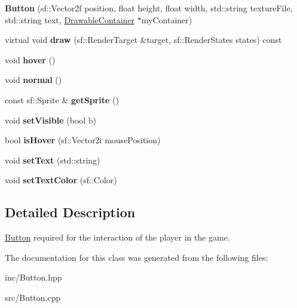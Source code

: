 \begin{DoxyCompactItemize}
\item 
\hypertarget{class_button_a7a01c89d2c25933075045e118d913ddb}{{\bfseries Button} (sf\+::\+Vector2f position, float height, float width, std\+::string texture\+File, std\+::string text, \hyperlink{class_drawable_container}{Drawable\+Container} $\ast$my\+Container)}\label{class_button_a7a01c89d2c25933075045e118d913ddb}

\item 
\hypertarget{class_button_a5e03d641bbba9c1e13d4e0425f4c7c2c}{virtual void {\bfseries draw} (sf\+::\+Render\+Target \&target, sf\+::\+Render\+States states) const }\label{class_button_a5e03d641bbba9c1e13d4e0425f4c7c2c}

\item 
\hypertarget{class_button_a1a5ca19ed8efe0ea27625217dcab9f2c}{void {\bfseries hover} ()}\label{class_button_a1a5ca19ed8efe0ea27625217dcab9f2c}

\item 
\hypertarget{class_button_a5d21d59606d801ca943ef1a650a3e446}{void {\bfseries normal} ()}\label{class_button_a5d21d59606d801ca943ef1a650a3e446}

\item 
\hypertarget{class_button_a417cd0b2bc9811c933de0548133177e4}{const sf\+::\+Sprite \& {\bfseries get\+Sprite} ()}\label{class_button_a417cd0b2bc9811c933de0548133177e4}

\item 
\hypertarget{class_button_a7f5094a839077f9b6f07fde8d3c6d250}{void {\bfseries set\+Visible} (bool b)}\label{class_button_a7f5094a839077f9b6f07fde8d3c6d250}

\item 
\hypertarget{class_button_a7be385b4044f3f110babd49dbea089aa}{bool {\bfseries is\+Hover} (sf\+::\+Vector2i mouse\+Position)}\label{class_button_a7be385b4044f3f110babd49dbea089aa}

\item 
\hypertarget{class_button_a5afe171a85f4a81c731e9b9ec7098c53}{void {\bfseries set\+Text} (std\+::string)}\label{class_button_a5afe171a85f4a81c731e9b9ec7098c53}

\item 
\hypertarget{class_button_ad3419dfb5c268b705b479facad6ad1b9}{void {\bfseries set\+Text\+Color} (sf\+::\+Color)}\label{class_button_ad3419dfb5c268b705b479facad6ad1b9}

\end{DoxyCompactItemize}


\subsection{Detailed Description}
\hyperlink{class_button}{Button} required for the interaction of the player in the game. 

The documentation for this class was generated from the following files\+:\begin{DoxyCompactItemize}
\item 
inc/Button.\+hpp\item 
src/Button.\+cpp\end{DoxyCompactItemize}
